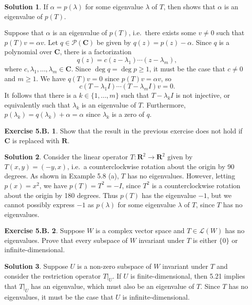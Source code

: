 \documentclass[12pt]{article}
\theoremstyle{definition}
\theoremstyle{exercise}
\newtheorem{exercise}{Exercise 5.B.}
\theoremstyle{solution}
\newtheorem*{solution}{Solution}
\newcommand{\poly}{\mathcal{P}}
\newcommand{\lmap}{\mathcal{L}}
\newcommand{\R}{\mathbf{R}}
\newcommand{\C}{\mathbf{C}}
\begin{document}
\begin{solution}
    If \( \alpha = p(\lambda) \) for some eigenvalue \( \lambda \) of \( T \), then  shows that \( \alpha \) is an eigenvalue of \( p(T) \).

    Suppose that \( \alpha \) is an eigenvalue of \( p(T) \), i.e.\ there exists some \( v \neq 0 \) such that \( p(T)v = \alpha v \). Let \( q \in \poly(\C) \) be given by \( q(z) = p(z) - \alpha \). Since \( q \) is a polynomial over \( \C \), there is a factorization
    \[
        q(z) = c (z - \lambda_1) \cdots (z - \lambda_m),
    \]
    where \( c, \lambda_1, \ldots, \lambda_m \in \C \). Since \( \deg q = \deg p \geq 1 \), it must be the case that \( c \neq 0 \) and \( m \geq 1 \). We have \( q(T)v = 0 \) since \( p(T)v = \alpha v \), so
    \[
        c(T - \lambda_1 I) \cdots (T - \lambda_m I) v = 0.
    \]
    It follows that there is a \( k \in \{ 1, \ldots, m \} \) such that \( T - \lambda_k I \) is not injective, or equivalently such that \( \lambda_k \) is an eigenvalue of \( T \). Furthermore, \( p(\lambda_k) = q(\lambda_k) + \alpha = \alpha \) since \( \lambda_k \) is a zero of \( q \).
\end{solution}

\begin{exercise}
\label{ex:12}
    Show that the result in the previous exercise does not hold if \( \C \) is replaced with \( \R \).
\end{exercise}

\begin{solution}
    Consider the linear operator \( T : \R^2 \to \R^2 \) given by \( T(x, y) = (-y, x) \), i.e.\ a counterclockwise rotation about the origin by 90 degrees. As shown in Example 5.8 (a), \( T \) has no eigenvalues. However, letting \( p(x) = x^2 \), we have \( p(T) = T^2 = -I \), since \( T^2 \) is a counterclockwise rotation about the origin by 180 degrees. Thus \( p(T) \) has the eigenvalue \( -1 \), but we cannot possibly express \( -1 \) as \( p(\lambda) \) for some eigenvalue \( \lambda \) of \( T \), since \( T \) has no eigenvalues.
\end{solution}

\begin{exercise}
\label{ex:13}
    Suppose \( W \) is a complex vector space and \( T \in \lmap(W) \) has no eigenvalues. Prove that every subspace of \( W \) invariant under \( T \) is either \( \{ 0 \} \) or infinite-dimensional.
\end{exercise}

\begin{solution}
    Suppose \( U \) is a non-zero subspace of \( W \) invariant under \( T \) and consider the restriction operator \( T|_U \). If \( U \) is finite-dimensional, then 5.21 implies that \( T|_U \) has an eigenvalue, which must also be an eigenvalue of \( T \). Since \( T \) has no eigenvalues, it must be the case that \( U \) is infinite-dimensional.
\end{solution}
\end{document}
